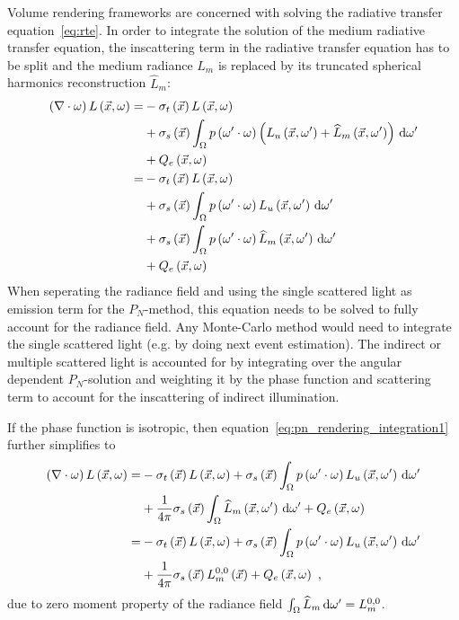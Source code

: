 Volume rendering frameworks are concerned with solving the radiative transfer equation~\ref{eq:rte}. In order to integrate the solution of the medium radiative transfer equation, the inscattering term in the radiative transfer equation has to be split and the medium radiance $L_m$ is replaced by its truncated spherical harmonics reconstruction $\widehat{L}_m$:
\begin{align}
\left(\nabla\cdot\omega\right)L\left(\vec{x}, \omega \right)
=&
-\sigma_t\left(\vec{x}\right) L\left(\vec{x}, \omega \right)\nonumber\\
&
+\sigma_s\left(\vec{x}\right) \int_{\Omega}
{
p\left(\omega'\cdot\omega\right)\left(L_u\left(\vec{x}, \omega' \right)+\widehat{L}_m\left(\vec{x}, \omega' \right)\right)\,\mathrm{d}\omega'
}
\nonumber
\\
&
+Q_e\left(\vec{x}, \omega\right)
\nonumber
\\
=&
-\sigma_t\left(\vec{x}\right) L\left(\vec{x}, \omega \right)
\nonumber\\
&
+\sigma_s\left(\vec{x}\right) \int_{\Omega}
{
p\left(\omega'\cdot\omega\right)L_u\left(\vec{x}, \omega' \right)\,\mathrm{d}\omega'
}
\nonumber\\
&
+\sigma_s\left(\vec{x}\right) \int_{\Omega}
{
p\left(\omega'\cdot\omega\right)\widehat{L}_m\left(\vec{x}, \omega' \right)\,\mathrm{d}\omega'
}
\nonumber\\
&
+Q_e\left(\vec{x}, \omega\right)
\label{eq:pn_rendering_integration1}
\end{align}
When seperating the radiance field and using the single scattered light as emission term for the $P_N$-method, this equation needs to be solved to fully account for the radiance field. Any Monte-Carlo method would need to integrate the single scattered light (e.g. by doing next event estimation). The indirect or multiple scattered light is accounted for by integrating over the angular dependent $P_N$-solution and weighting it by the phase function and scattering term to account for the inscattering of indirect illumination.

If the phase function is isotropic, then equation~\ref{eq:pn_rendering_integration1} further simplifies to
\begin{align}
\left(\nabla\cdot\omega\right)L\left(\vec{x}, \omega \right)
=&
-\sigma_t\left(\vec{x}\right) L\left(\vec{x}, \omega \right)
+\sigma_s\left(\vec{x}\right) \int_{\Omega}
{
p\left(\omega'\cdot\omega\right)L_u\left(\vec{x}, \omega' \right)\,\mathrm{d}\omega'
}
\nonumber\\
&
+
\frac{1}{4\pi}
\sigma_s\left(\vec{x}\right)
\int_{\Omega}
{
\widehat{L}_m\left(\vec{x}, \omega' \right)\,\mathrm{d}\omega'
}
+Q_e\left(\vec{x}, \omega\right)
\nonumber\\
=&
-\sigma_t\left(\vec{x}\right) L\left(\vec{x}, \omega \right)
+\sigma_s\left(\vec{x}\right) \int_{\Omega}
{
p\left(\omega'\cdot\omega\right)L_u\left(\vec{x}, \omega' \right)\,\mathrm{d}\omega'
}
\nonumber\\
&
+
\frac{1}{4\pi}
\sigma_s\left(\vec{x}\right)
L_m^{0,0}\left(\vec{x}\right)
+Q_e\left(\vec{x}, \omega\right)
\ ,
\label{eq:pn_rendering_integration2}
\end{align}
due to zero moment property of the radiance field $\int_{\Omega}\widehat{L}_m\,\mathrm{d}\omega'=L_m^{0,0}$.

